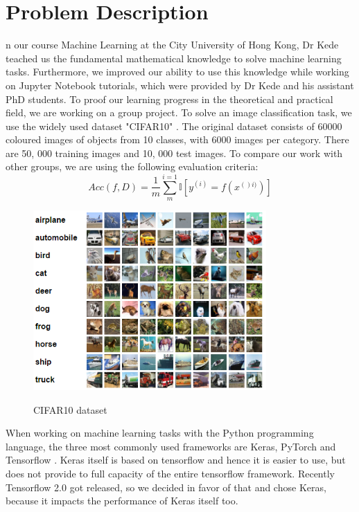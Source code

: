 \documentclass[journal]{IEEEtran}
\begin{document}
\section{Problem Description}
\label{sec:problemDescription}
n our course Machine Learning at the City University of Hong Kong, Dr Kede teached us the fundamental mathematical knowledge to solve machine learning tasks. Furthermore, we improved our ability to use this knowledge while working on Jupyter Notebook tutorials, which were provided by Dr Kede and his assistant PhD students. To proof our learning progress in the theoretical and practical field, we are working on a group project. To solve an image classification task, we use the widely used dataset  "CIFAR10" \cite{echersly}\cite{mostpopular}. The original dataset consists of 60000 coloured images of objects from 10 classes, with 6000 images per category. There are 50, 000 training images and 10, 000 test images. To compare our work with other groups, we are using the following evaluation criteria:
\begin{equation}
Acc(f,D) = \frac{1}{m}\sum_{m}^{i=1} \mathbb{I} \left [ y^{(i)} =f(x^{()i)})\right ]
\label{acc}
\end{equation}
\begin{figure}
  \begin{center}
  \includegraphics[width=3.5in]{photo/image32.png}\\
  \caption{CIFAR10 dataset}\label{cifar10}
  \end{center}
\end{figure}
\noindent When working on machine learning tasks with the Python programming language, the three most commonly used frameworks are Keras, PyTorch and Tensorflow \cite{favFrameworks}. Keras itself is based on tensorflow and hence it is easier to use, but does not provide to full capacity of the entire tensorflow framework\cite{DlKeras}. Recently Tensorflow 2.0 got released, so we decided in favor of that and chose Keras, because it impacts the performance of Keras itself too. 
\end{document}
